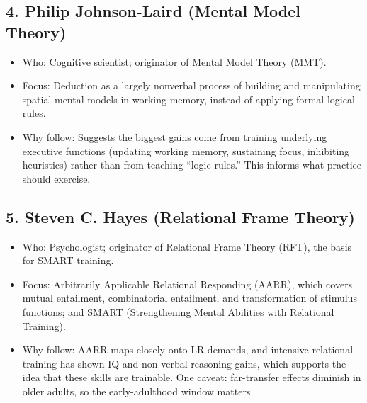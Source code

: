 \documentclass[11pt]{article}
\begin{document}
\subsection*{4. Philip Johnson-Laird (Mental Model Theory)}
\begin{itemize}
\item Who: Cognitive scientist; originator of Mental Model Theory (MMT).
\item Focus: Deduction as a largely nonverbal process of building and manipulating spatial mental models in working memory, instead of applying formal logical rules.
\item Why follow: Suggests the biggest gains come from training underlying executive functions (updating working memory, sustaining focus, inhibiting heuristics) rather than from teaching \enquote{logic rules.} This informs what practice should exercise.
\end{itemize}

\subsection*{5. Steven C. Hayes (Relational Frame Theory)}
\begin{itemize}
\item Who: Psychologist; originator of Relational Frame Theory (RFT), the basis for SMART training.
\item Focus: Arbitrarily Applicable Relational Responding (AARR), which covers mutual entailment, combinatorial entailment, and transformation of stimulus functions; and SMART (Strengthening Mental Abilities with Relational Training).
\item Why follow: AARR maps closely onto LR demands, and intensive relational training has shown IQ and non-verbal reasoning gains, which supports the idea that these skills are trainable. One caveat: far-transfer effects diminish in older adults, so the early-adulthood window matters.
\end{itemize}
\end{document}
